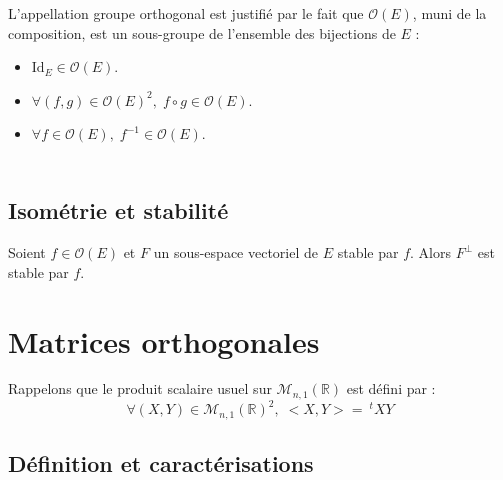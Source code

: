 \documentclass[french,11pt,twoside]{VcCours}
\begin{document}
L'appellation groupe orthogonal est justifié par le fait que $\mathcal{O}(E)$, muni de la composition, est un sous-groupe de l'ensemble des bijections de $E$ :

\begin{Proposition}{} 
\begin{itemize}
\item $\textrm{Id}_E \in \mathcal{O}(E)$.
\item $\forall (f,g) \in \mathcal{O}(E)^2, \; f \circ g \in \mathcal{O}(E)$.
\item $\forall f \in \mathcal{O}(E), \; f^{-1} \in \mathcal{O}(E)$.
\end{itemize}
\end{Proposition}

\begin{Demonstration}{}
\vspace{5cm}
\end{Demonstration}

\newpage

$\phantom{test}$

\vspace{2.5cm}

\subsection{Isométrie et stabilité}

\begin{Proposition}{} Soient $f \in \mathcal{O}(E)$ et $F$ un sous-espace vectoriel de $E$ stable par $f$. Alors $F^{\perp}$ est stable par $f$.
\end{Proposition}

\begin{Demonstration}{}

\vspace{5cm}
\end{Demonstration}


\section{Matrices orthogonales}

Rappelons que le produit scalaire usuel sur $\mathcal{M}_{n,1}(\mathbb{R})$ est défini par :
$$ \forall (X,Y) \in \mathcal{M}_{n,1}(\mathbb{R})^2, \; <X,Y> = ~^tX Y$$
\subsection{Définition et caractérisations}
\end{document}
